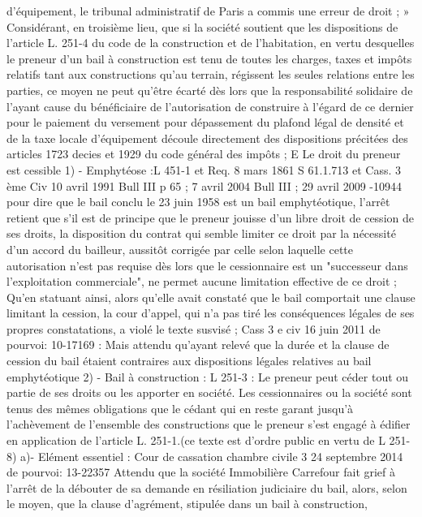 \documentclass[11pt,a4paper]{report}
\begin{document}
	d'équipement, le tribunal administratif de Paris a commis une erreur de droit ; »
	Considérant, en troisième lieu, que si la société soutient que les dispositions de l'article L. 251-4 du code de la
	construction et de l'habitation, en vertu desquelles le preneur d'un bail à construction est tenu de toutes les
	charges, taxes et impôts relatifs tant aux constructions qu'au terrain, régissent les seules relations entre les
	parties, ce moyen ne peut qu'être écarté dès lors que la responsabilité solidaire de l'ayant cause du bénéficiaire
	de l'autorisation de construire à l'égard de ce dernier pour le paiement du versement pour dépassement du
	plafond légal de densité et de la taxe locale d'équipement découle directement des dispositions précitées des
	articles 1723 decies et 1929 du code général des impôts ;
	E Le droit du preneur est cessible
	1) - Emphytéose :L 451-1 et Req. 8 mars 1861 S 61.1.713 et Cass. 3 ème Civ 10 avril 1991 Bull III  p 65 ; 7
	avril 2004 Bull III  ; 29 avril 2009 -10944 pour dire que le bail conclu le 23 juin 1958 est un bail
	emphytéotique, l'arrêt retient que s'il est de principe que le preneur jouisse d'un libre droit de cession de ses
	droits, la disposition du contrat qui semble limiter ce droit par la nécessité d'un accord du bailleur, aussitôt
	corrigée par celle selon laquelle cette autorisation n'est pas requise dès lors que le cessionnaire est un
	"successeur dans l'exploitation commerciale", ne permet aucune limitation effective de ce droit ;
	Qu'en statuant ainsi, alors qu'elle avait constaté que le bail comportait une clause limitant la cession, la cour
	d'appel, qui n'a pas tiré les conséquences légales de ses propres constatations, a violé le texte susvisé ;
	Cass 3 e civ 16 juin 2011 \No  de pourvoi: 10-17169 : Mais attendu qu'ayant relevé que la durée et la clause de
	cession du bail étaient contraires aux dispositions légales relatives au bail emphytéotique
	2) - Bail à construction : L 251-3 : Le preneur peut céder tout ou partie de ses droits ou les apporter en société. Les
	cessionnaires ou la société sont tenus des mêmes obligations que le cédant qui en reste garant jusqu'à
	l'achèvement de l'ensemble des constructions que le preneur s'est engagé à édifier en application de l'article L.
	251-1.(ce texte est d’ordre public en vertu de L 251-8)
	a)- Elément essentiel : Cour de cassation chambre civile 3 24 septembre 2014 \No  de pourvoi: 13-22357
	Attendu que la société Immobilière Carrefour fait grief à l'arrêt de la débouter de sa demande en résiliation
	judiciaire du bail, alors, selon le moyen, que la clause d'agrément, stipulée dans un bail à construction,
\end{document}
